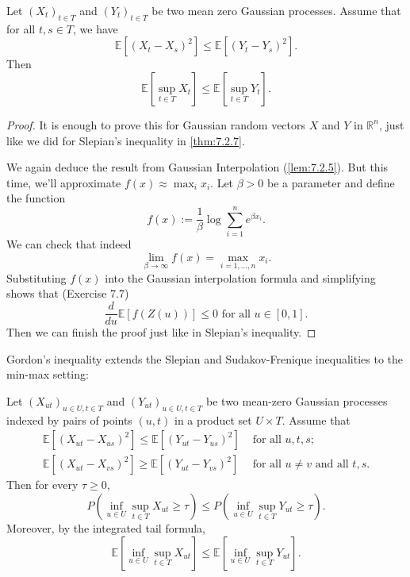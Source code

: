 \begin{theorem}
\label{thm:7.2.8}
Let $(X_t)_{t \in T}$ and $(Y_t)_{t \in T}$ be two mean zero Gaussian processes. Assume that for all $t, s 
\in T$, we have 
\[ \mathbb{E}\left[ (X_t - X_s)^2 \right] \leq \mathbb{E}\left[ (Y_t - Y_s)^2 \right]. \]
Then 
\[ \mathbb{E}\left[ \sup_{t \in T}X_t \right] \leq \mathbb{E}\left[ \sup_{t \in T}Y_t \right]. \]
\end{theorem}

\begin{proof}
It is enough to prove this for Gaussian random vectors $X$ and $Y$ in $\mathbb{R}^n$, just like we did for 
Slepian's inequality in \cref{thm:7.2.7}. 

We again deduce the result from Gaussian Interpolation (\cref{lem:7.2.5}). But this time, we'll approximate 
$f(x) \approx \max_{i} x_i$. Let $\beta > 0$ be a parameter and define the function 
\[  f(x) := \frac{1}{\beta}\log_{}{\sum_{i = 1}^{n} e^{\beta x_i}}. \]
We can check that indeed 
\[ \lim_{\beta \to \infty} f(x) = \max_{i = 1, \dots, n}x_i. \]
Substituting $f(x)$ into the Gaussian interpolation formula and simplifying shows that (Exercise 7.7)
\[ \frac{d}{du}\mathbb{E}\left[ f(Z(u)) \right] \leq 0 \text{ for all } u \in [0, 1]. \]
Then we can finish the proof just like in Slepian's inequality.
\end{proof}

Gordon's inequality extends the Slepian and Sudakov-Frenique inequalities to the min-max setting:

\begin{theorem}
\label{thm:7.2.9}
Let $(X_{ut})_{u \in U, t \in T}$ and $(Y_{ut})_{u \in U, t \in T}$ be two mean-zero Gaussian processes indexed 
by pairs of points $(u, t)$ in a product set $U \times T$. Assume that 
\begin{align*}
	\mathbb{E}\left[ (X_{ut} - X_{us})^2 \right] \leq \mathbb{E}\left[ (Y_{ut} - Y_{us})^2 \right] 
	&\text{ for all } u, t, s; \\
	\mathbb{E}\left[ (X_{ut} - X_{vs})^2 \right] \geq \mathbb{E}\left[ (Y_{ut} - Y_{vs})^2 \right] 
	&\text{ for all } u \neq v \text{ and all } t, s.
\end{align*}
Then for every $\tau \geq 0$, 
\[ P \left( \inf_{u \in U}\sup_{t \in T} X_{ut} \geq \tau \right) 
\leq P \left( \inf_{u \in U}\sup_{t \in T} Y_{ut} \geq \tau \right). \]
Moreover, by the integrated tail formula, 
\[ \mathbb{E}\left[ \inf_{u \in U}\sup_{t \in T} X_{ut} \right] \leq 
\mathbb{E}\left[ \inf_{u \in U}\sup_{t \in T} Y_{ut} \right]. \]
\end{theorem}

